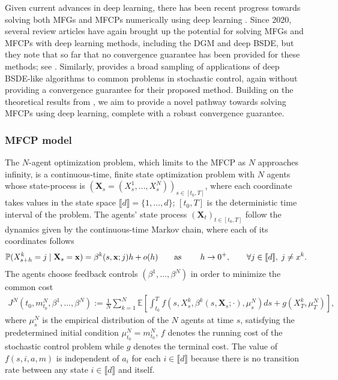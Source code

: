 \documentclass[11pt,reqno]{amsart}
\numberwithin{equation}{section}
\theoremstyle{plain}
\renewcommand{\P}{\mathbb{P}}
\newcommand{\E}{\mathbb{E}}
\newcommand{\lbrs}[1]{\llbracket #1 \rrbracket}
\begin{document}
Given current advances in deep learning, there has been recent progress towards solving both MFGs and MFCPs numerically using deep learning \cite{ml-mfcp, deep-learning-mfcp}. Since 2020, several review articles have again brought up the potential for solving MFGs and MFCPs with deep learning methods, including the DGM and deep BSDE, but they note that so far that no convergence guarantee has been provided for these methods; see \cite{mfc-mfcp-review, scalable-rl-mfg}. Similarly, \cite{actor-critic-bsde} provides a broad sampling of applications of deep BSDE-like algorithms to common problems in stochastic control, again without providing a convergence guarantee for their proposed method. Building on the theoretical results from \cite{mfcp}, we aim to provide a novel pathway towards solving MFCPs using deep learning, complete with a robust convergence guarantee.





\subsubsection{MFCP model} The $N$-agent optimization problem, which limits to the MFCP as $N$ approaches infinity, is a continuous-time, finite state optimization problem with $N$ agents whose state-process is $(\mathbf{X}_s = (X^1_s, \ldots, X^N_s))_{s\in[t_0,T]}$, where each coordinate takes values in the state space $\lbrs{d} = \{1, \ldots, d\}$; $[t_0,T]$ is the deterministic time interval of the problem. The agents' state process $(\mathbf{X}_t)_{t\in[t_0,T]}$ follow the dynamics given by the continuous-time Markov chain, where each of its coordinates follows 
\begin{align}
\label{eq:n-agent}
    \P(X_{s+h}^k = j \mid \mathbf{X}_s = \mathbf{x}) = \beta^k(s, \mathbf{x};j)h + o(h)\qquad\text{as \qquad $h\to0^+$},\qquad \forall j\in\lbrs{d},\; j\ne x^k.
\end{align}
The agents choose feedback controls $(\beta^1, \ldots, \beta^N)$ in order to minimize the common cost
\begin{align}
    J^N(t_0, m^N_{t_0}, \beta^1, \ldots, \beta^N) := \frac{1}{N} \sum_{k=1}^N\E\left[\int_{t_0}^T f(s, X_s^k, \beta^k(s, \mathbf{X}_s;\cdot), \mu_s^N) ds + g(X^k_T, \mu_T^N)\right] \label{eq:n-agent-cost},
\end{align}
where $\mu^N_s$ is the empirical distribution of the $N$ agents at time $s$, satisfying the predetermined initial condition $\mu^N_{t_0}=m^N_{t_0}$, $f$ denotes the running cost of the stochastic control problem while $g$ denotes the terminal cost. The value of $f(s,i,a,m)$ is independent of $a_i$ for each $i \in \lbrs{d}$ because there is no transition rate between any state $i \in \lbrs{d}$ and itself. 
\end{document}
